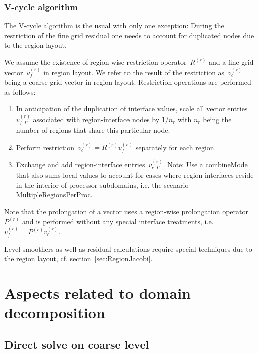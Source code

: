 \documentclass[11pt]{article}
\begin{document}
\subsubsection{V-cycle algorithm}

The V-cycle algorithm is the usual with only one exception:
During the restriction of the fine grid residual one needs to account for duplicated nodes due to the region layout.

We assume the existence of region-wise restriction operator~$R^{(r)}$ and a fine-grid vector~$v^{(r)}_f$ in region layout.
We refer to the result of the restriction as~$v^{(r)}_c$ being a coarse-grid vector in region-layout.
Restriction operations are performed as follows:
\begin{enumerate}
\item In anticipation of the duplication of interface values, scale all vector entries~$v^{(r)}_{f,\Gamma}$
associated with region-interface nodes by $1/n_r$ with $n_r$ being the number of regions that share this particular node.
\item Perform restriction~$v^{(r)}_c = R^{(r)} v^{(r)}_f$ separately for each region.
\item Exchange and add region-interface entries~$v^{(r)}_{c,\Gamma}$. Note: Use a {\sf combineMode} that also sums local values to account for cases where region interfaces reside in the interior of processor subdomains, i.e. the scenario {\sf MultipleRegionsPerProc}.
\end{enumerate}

Note that the prolongation of a vector uses a region-wise prolongation operator~$P^{(r)}$
and is performed without any special interface treatments, i.e. $v^{(r)}_f = P^{(r)}v^{(r)}_c$.

Level smoothers as well as residual calculations require special techniques due to the region layout, cf. section~\ref{sec:RegionJacobi}.

\section{Aspects related to domain decomposition}

\subsection{Direct solve on coarse level}
\end{document}
